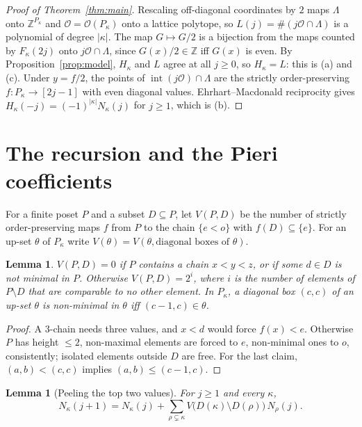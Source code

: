 \documentclass[submission]{FPSAC2027}
\newtheorem{lemma}[theorem]{Lemma}
\theoremstyle{definition}
\theoremstyle{remark}
\newcommand{\Z}{\mathbb{Z}}
\newcommand{\ord}{\mathcal{O}}
\newcommand{\interior}{\operatorname{int}}
\begin{document}
\begin{proof}[Proof of Theorem~\ref{thm:main}]
Rescaling off-diagonal coordinates by $2$ maps $\Lambda$ onto $\Z^{P_\kappa}$ and $\ord=\ord(P_\kappa)$
onto a lattice polytope, so $L(j)=\#(j\ord\cap\Lambda)$ is a polynomial of degree $|\kappa|$. The
map $G\mapsto G/2$ is a bijection from the maps counted by $F_\kappa(2j)$ onto $j\ord\cap\Lambda$,
since $G(x)/2\in\Z$ iff $G(x)$ is even. By Proposition~\ref{prop:model}, $H_\kappa$ and $L$ agree
at all $j\ge0$, so $H_\kappa=L$: this is (a) and (c). Under $y=f/2$, the points of
$\interior(j\ord)\cap\Lambda$ are the strictly order-preserving $f\colon P_\kappa\to[2j-1]$ with
even diagonal values. Ehrhart--Macdonald reciprocity gives
$H_\kappa(-j)=(-1)^{|\kappa|}N_\kappa(j)$ for $j\ge1$, which is (b).
\end{proof}



\section{The recursion and the Pieri coefficients}\label{sec:recursion}

For a finite poset $P$ and a subset $D\subseteq P$, let $V(P,D)$ be the number of strictly
order-preserving maps $f$ from $P$ to the chain $\{e<o\}$ with $f(D)\subseteq\{e\}$. For an up-set $\theta$ of
$P_\kappa$ write $V(\theta)=V(\theta,\text{diagonal boxes of }\theta)$.

\begin{lemma}\label{lem:R}
$V(P,D)=0$ if $P$ contains a chain $x<y<z$, or if some $d\in D$ is not minimal in $P$.
Otherwise $V(P,D)=2^i$, where $i$ is the number of elements of $P\setminus D$ that are
comparable to no other element. In $P_\kappa$, a diagonal box $(c,c)$ of an up-set $\theta$ is
non-minimal in $\theta$ iff $(c-1,c)\in\theta$.
\end{lemma}

\begin{proof}
A $3$-chain needs three values, and $x<d$ would force $f(x)<e$. Otherwise $P$ has height
$\le2$, non-maximal elements are forced to $e$, non-minimal ones to $o$, consistently; isolated
elements outside $D$ are free. For the last claim, $(a,b)<(c,c)$ implies $(a,b)\le(c-1,c)$.
\end{proof}

\begin{lemma}[Peeling the top two values]\label{lem:peel}
For $j\ge1$ and every $\kappa$,
\[ N_\kappa(j+1)=N_\kappa(j)+\sum_{\rho\subsetneq\kappa}V\bigl(D(\kappa)\setminus D(\rho)\bigr)\,N_\rho(j). \]
\end{lemma}
\end{document}
